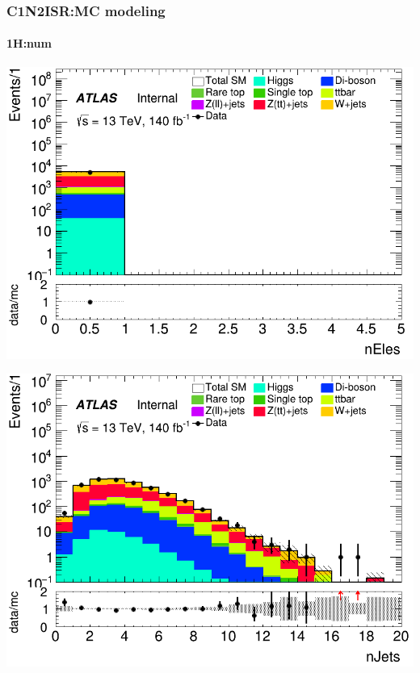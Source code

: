 \documentclass[usenames,dvipsnames]{beamer}
\begin{document}
\begin{frame}
\frametitle{C1N2ISR:MC modeling}
\framesubtitle{1H:\quad num}
    \begin{minipage}{0.32\textwidth}
        \centering
        \includegraphics[width=\textwidth]{graphics/H_met/H_met_nEles.png}
    \end{minipage}
    \hfill
    \begin{minipage}{0.32\textwidth}
        \centering
        \includegraphics[width=\textwidth]{graphics/H_met/H_met_nJets.png}
    \end{minipage}
    \hfill
    \begin{minipage}{0.32\textwidth}
        \centering

\end{minipage}
\end{frame}
\end{document}
